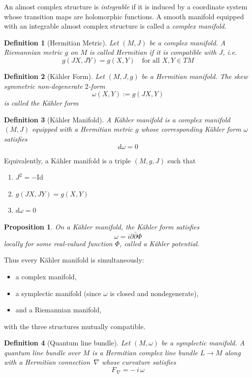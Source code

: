 \documentclass[
  12pt,
  a4paper, oneside
]{report}
\theoremstyle{bolddef}
\newtheorem{definition}{Definition}
\newtheorem{proposition}[theorem]{Proposition}
\theoremstyle{remark}
\numberwithin{equation}{chapter}
\begin{document}
An almost complex structure is \textit{integrable} if it is induced by a coordinate system whose transition maps are holomorphic functions. A smooth manifold equipped with an integrable almost complex structure
is called a \emph{complex manifold}.

\begin{definition}[Hermitian Metric]
Let $(M,J)$ be a complex manifold.
A Riemannian metric $g$ on $M$ is called \emph{Hermitian}
if it is compatible with $J$, i.e.
$$
g(JX,JY) = g(X,Y)
\quad
\text{for all } X,Y \in TM
$$
\end{definition}


\begin{definition}[Kähler Form]
Let $(M,J,g)$ be a Hermitian manifold.
The skew symmetric non-degenerate $2$-form
$$
\omega(X,Y) := g(JX,Y)
$$
is called the \textit{Kähler form}
\end{definition}

\begin{definition}[Kähler Manifold]
A \emph{Kähler manifold} is a complex manifold $(M,J)$
equipped with a Hermitian metric $g$
whose corresponding Kähler form $\omega$ satisfies
$$
d\omega = 0
$$
\end{definition}

Equivalently, a Kähler manifold is a triple $(M,g,J)$ such that

\begin{enumerate}
\item $J^2 = -\mathrm{Id}$
\item $g(JX,JY)=g(X,Y)$
\item  $d\omega=0$
\end{enumerate}


\begin{proposition}
On a Kähler manifold, the Kähler form satisfies
$$
\omega = i \partial \bar\partial \Phi
$$
locally for some real-valued function $\Phi$,
called a \emph{Kähler potential}.
\end{proposition}
Thus every Kähler manifold is simultaneously:
\begin{itemize}
\item a complex manifold,
\item a symplectic manifold (since $\omega$ is closed and nondegenerate),
\item and a Riemannian manifold,
\end{itemize}
with the three structures mutually compatible.
\begin{definition}[Quantum line bundle]
Let $(M,\omega)$ be a symplectic manifold. 
A \emph{quantum line bundle} over $M$ is a Hermitian complex line bundle
$L \to M$ along with a Hermitian connection $\,\nabla$
whose curvature satisfies
$$
  F_{\,\nabla} = -\, i\, \omega
$$
\end{definition}
\end{document}
